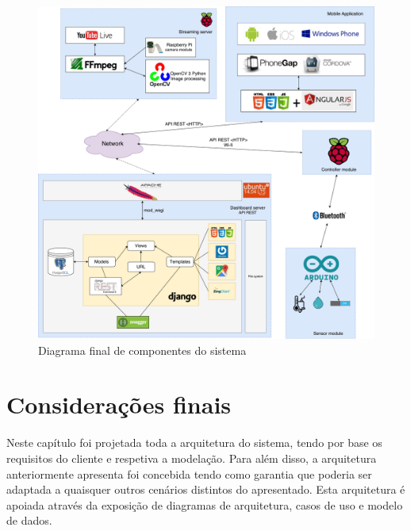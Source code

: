 \newpage

\begin{figure}[!htb]
	\centering
	\includegraphics[width=\linewidth]{esquemas/arquitetura-final.pdf}
	\caption{Diagrama final de componentes do sistema}
	\label{componentesall}
\end{figure}







\section{Considerações finais}


Neste capítulo foi projetada toda a arquitetura do sistema, tendo por base os requisitos do cliente e respetiva a modelação. Para além disso, a arquitetura anteriormente apresenta foi concebida tendo como garantia que poderia ser adaptada a quaisquer outros cenários distintos do apresentado. Esta arquitetura é apoiada através da exposição de diagramas de arquitetura, casos de uso e modelo de dados. 







